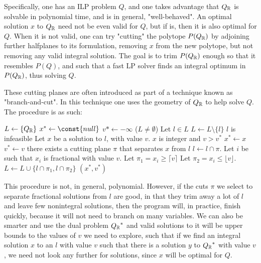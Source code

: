 Specifically, one has an ILP problem $Q$, and one takes advantage that $Q_{\mathbb{R}}$ is solvable in polynomial time, and is in general, "well-behaved". An optimal solution $x$ to $Q_{\mathbb{R}}$ need not be even valid for $Q$, but if is, then it is also optimal for $Q$. When it is not valid, one can try "cutting" the polytope $P(Q_{\mathbb{R}})$ by adjoining further halfplanes to its formulation, removing $x$ from the new polytope, but not removing any valid integral solution. The goal is to trim $P(Q_{\mathbb{R}})$ enough so that it resembles $P(Q)$, and such that a fast LP solver finds an integral optimum in $P(Q_{\mathbb{R}})$, thus solving $Q$.

These cutting planes are often introduced as part of a technique known as "branch-and-cut". In this technique one uses the geometry of $Q_{\mathbb{R}}$ to help solve $Q$. The procedure is as such:

\begin{codebox}
\li $L \gets \{Q_{\mathbb{R}}\}$
\li $x^* \gets \const{null}$
\li $v* \gets -\infty$
\li \While ($L \ne \emptyset$)
 \Do
\li    Let $l \in L$
\li    $L \gets L \setminus \{l\}$
\li    \If $l$ is infeasible
    \Do
\li      {}
    \End
\li    Let $x$ be a solution to $l$, with value $v$.
\li    \If $x$ is integer and $v > v^*$
    \Do
\li      $x^* \gets x$
\li      $v^* \gets v$
\li      {}
    \End
\li    \If there exists a cutting plane $\pi$ that separates $x$ from $l$
    \Do
\li      $l \gets l \cap \pi$.
\li      {}
    \End
\li    Let $i$ be such that $x_i$ is fractional with value $v$.
\li    Let $\pi_1 = x_i \ge \lceil v \rceil$
\li    Let $\pi_2 = x_i \le \lfloor v \rfloor$.
\li    $L \gets L \cup \{l \cap \pi_1, l \cap \pi_2\}$
    \End
\li \Return $(x^*, v^*)$
\end{codebox}

This procedure is not, in general, polynomial. However, if the cuts $\pi$ we select to separate fractional solutions from $l$ are good, in that they trim away a lot of $l$ and leave few nonintegral solutions, then the program will, in practice, finish quickly, because it will not need to branch on many variables. We can also be smarter and use the dual problem ${Q_{\mathbb{R}}}^*$ and valid solutions to it will be upper bounds to the values of $v$ we need to explore, such that if we find an integral solution $x$ to an $l$ with value $v$ such that there is a solution $y$ to ${Q_{\mathbb{R}}}^*$ with value $v$, we need not look any further for solutions, since $x$ will be optimal for $Q$.

